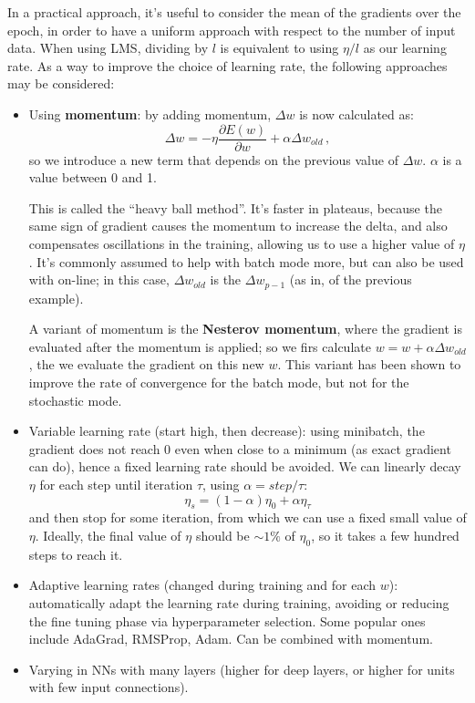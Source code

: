 In a practical approach, it's useful to consider the mean of the gradients over the epoch, in order to have a uniform approach with respect to the number of input data. When using LMS, dividing by $l$ is equivalent to using $\eta/l$ as our learning rate. As a way to improve the choice of learning rate, the following approaches may be considered:

\begin{itemize}
    \item Using \textbf{momentum}: by adding momentum, $\Delta w$ is now calculated as:
    \begin{equation*}
        \Delta w = - \eta \dfrac{\partial E(w)}{\partial w} + \alpha \Delta w_{old} \, ,
    \end{equation*}
    so we introduce a new term that depends on the previous value of $\Delta w$. $\alpha$ is a value between 0 and 1.

    This is called the ``heavy ball method''. It's faster in plateaus, because the same sign of gradient causes the momentum to increase the delta, and also compensates oscillations in the training, allowing us to use a higher value of $\eta$. It's commonly assumed to help with batch mode more, but can also be used with on-line; in this case, $\Delta w_{old}$ is the $\Delta w_{p-1}$ (as in, of the previous example).

    A variant of momentum is the \textbf{Nesterov momentum}, where the gradient is evaluated after the momentum is applied; so we firs calculate $w = w + \alpha \Delta w_{old}$, the we evaluate the gradient on this new $w$. This variant has been shown to improve the rate of convergence for the batch mode, but not for the stochastic mode.
    
    \item Variable learning rate (start high, then decrease):
    using minibatch, the gradient does not reach 0 even when close to a minimum (as exact gradient can do), hence a fixed learning rate should be avoided. We can linearly decay $\eta$ for each step until iteration $\tau$, using $\alpha = step / \tau$:
    \begin{equation*}
        \eta_s = (1-\alpha)\eta_0 + \alpha \eta_{\tau} 
    \end{equation*}
    and then stop for some iteration, from which we can use a fixed small value of $\eta$. Ideally, the final value of $\eta$ should be $\sim 1\%$ of $\eta_0$, so it takes a few hundred steps to reach it.
    
    \item Adaptive learning rates (changed during training and for each $w$): automatically adapt the learning rate during training, avoiding or reducing the fine tuning phase via hyperparameter selection. Some popular ones include AdaGrad, RMSProp, Adam. Can be combined with momentum.
    
    \item Varying in NNs with many layers (higher for deep layers, or higher for units with few input connections).
\end{itemize}


